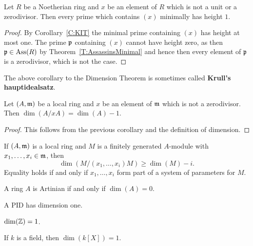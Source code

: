 \documentclass{ximera}
\begin{document}
\begin{corollary}
  Let $R$ be a Noetherian ring and $x$ be an element of $R$ which is
  not a unit or a zerodivisor. Then every prime which contains $(x)$
  minimally has height $1$.
  \begin{proof}
    By Corollary~\ref{C:KIT} the minimal prime containing $(x)$ has
    height at most one. The prime $\mathfrak{p}$ containing $(x)$ cannot have
    height zero, as then $\mathfrak{p}\in\operatorname{Ass}(R)$ by
    Theorem~\ref{T:AssassinsMinimal} and hence then every element of
    $\mathfrak{p}$ is a zerodivisor, which is not the case.
  \end{proof}
\end{corollary}

\begin{remark}
  The above corollary to the Dimension Theorem is sometimes called
  \textbf{Krull's hauptidealsatz}.
\end{remark}

\begin{corollary}\label{C:nzdd-1}
  Let $(A,\mathfrak{m})$ be a local ring and $x$ be an element of $\mathfrak{m}$ which is
  not a zerodivisor. Then $\dim(A/xA) = \dim(A)-1$.
  \begin{proof}
    This follows from the previous corollary and the definition of
    dimension.
  \end{proof}
\end{corollary}


\begin{exercise}
  If $(A,\mathfrak{m})$ is a local ring and $M$ is a finitely generated
  $A$-module with $x_1,\dots,x_i\in\mathfrak{m}$, then
  \[
  \dim(M/(x_1,\dots,x_i)M)\ge \dim(M) -i.
  \]
  Equality holds if and only if $x_1,\dots,x_i$ form part of a system
  of parameters for $M$.
\end{exercise}


\begin{example}
  A ring $A$ is Artinian if and only if $\dim(A) =
  0$. 
\end{example}

\begin{example}
  A PID has dimension one.
\end{example}

\begin{example}
  $\dim(\mathbb Z) = 1$.
\end{example}

\begin{example}
  If $k$ is a field, then $\dim(k[X]) = 1$.
\end{example}
\end{document}
